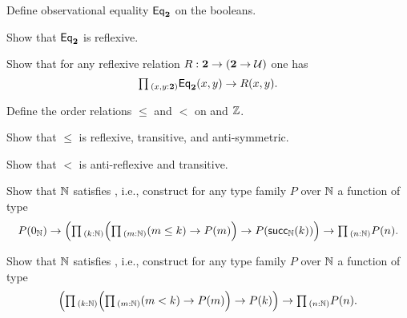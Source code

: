 \begin{exercises}
\begin{subexenum}
  \end{subexenum}
\item \label{ex:obs_bool}
  \begin{subexenum}
  \item Define observational equality $\mathsf{Eq}_\mathbf{2}$ on the booleans.
  \item Show that $\mathsf{Eq}_\mathbf{2}$ is reflexive.
  \item Show that for any reflexive relation $R:\mathbf{2}\to(\mathbf{2}\to \mathcal{U})$ one has
    \begin{equation*}
      \prd{x,y:\bool} \EqBool(x,y)\to R(x,y).
    \end{equation*}
  \end{subexenum}
\item \label{ex:int_order}
  \begin{subexenum}
  \item Define the order relations $\leq$ and $<$ on and ${\mathbb{Z}}$.
  \item Show that $\leq$ is reflexive, transitive, and anti-symmetric.
  \item Show that $<$ is anti-reflexive and transitive.
  \end{subexenum}
\item
  \begin{subexenum}
  \item Show that ${\mathbb{N}}$ satisfies , i.e., construct for any type family $P$ over ${\mathbb{N}}$ a function of type
    \begin{equation*}
      P(\zeroN) \to \Big(\prd{k:\N}\Big(\prd{m:\N} (m\leq k) \to P(m)\Big)\to P(\succN(k))\Big) \to \prd{n:\N}P(n).
    \end{equation*}
  \item Show that ${\mathbb{N}}$ satisfies , i.e., construct for any type family $P$ over ${\mathbb{N}}$ a function of type
    \begin{equation*}
      \Big(\prd{k:\N} \Big(\prd{m:\N} (m< k) \to P(m)\Big)\to P(k)\Big) \to \prd{n:\N}P(n).
    \end{equation*}
  \end{subexenum}
\begin{comment}
\item
  \begin{subexenum}
  \item For each $i:\mathsf{Fin}(\succN(n))$, define a function

\end{comment}
\end{exercises}
